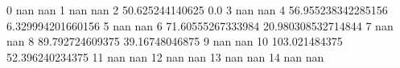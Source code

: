 0 nan nan
1 nan nan
2 50.625244140625 0.0
3 nan nan
4 56.955238342285156 6.329994201660156
5 nan nan
6 71.60555267333984 20.980308532714844
7 nan nan
8 89.792724609375 39.16748046875
9 nan nan
10 103.021484375 52.396240234375
11 nan nan
12 nan nan
13 nan nan
14 nan nan
